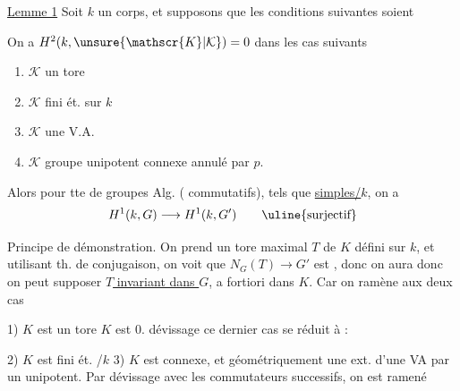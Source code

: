 \uline{Lemme 1} Soit $k$ un corps, et supposons que les conditions suivantes soient 

 On a $H^2(k,\unsure{\mathscr{K}|\mathcal{K}})=0$ dans les cas suivants 

\begin{enumerate}[label=\alph*)]
\item $\mathscr{K}$ un tore
\item $\mathscr{K}$  fini ét. sur $k$
\item $\mathscr{K}$ une V.A.
\item $\mathscr{K}$ groupe unipotent connexe annulé par $p$.
\end{enumerate}

Alors pour tte   de  groupes Alg.
( commutatifs), tels que   \uline{simples/$k$}, on a
\[
H^1(k,G)\longrightarrow H^1(k,G')\qquad\text{\uline{surjectif}}
\]

Principe de démonstration. On prend un tore maximal $T$ de $K$ défini sur $k$, et utilisant  th. de conjugaison, on voit que $N_G(T)\longrightarrow G'$ est  , donc on aura
donc on peut supposer \uline{$T$ invariant dans $G$}, a fortiori dans $K$. Car on  ramène aux deux cas

1) $K$ est un tore  $K$ est    0.  dévissage ce dernier cas se réduit à :

2) $K$ est fini ét. /$k$  3) $K$ est connexe, et géométriquement une ext. d'une VA par un unipotent. Par dévissage avec les commutateurs successifs, on est ramené

